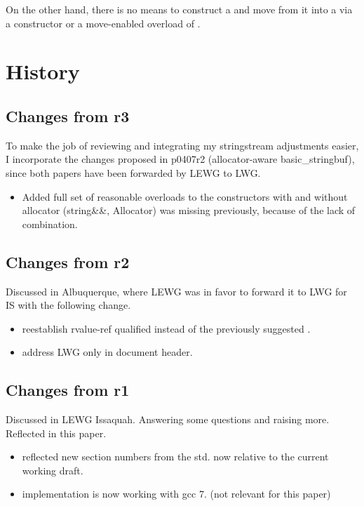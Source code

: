 \documentclass[ebook,11pt,article]{memoir}
\begin{document}
On the other hand, there is no means to construct a  and move from it into a  via a constructor or a move-enabled overload of .

\section{History}

\subsection{Changes from r3}
To make the job of reviewing and integrating my stringstream adjustments easier, I incorporate the changes proposed in p0407r2 (allocator-aware basic\_stringbuf), since both papers have been forwarded by LEWG to LWG.
\begin{itemize}
\item Added full set of reasonable overloads to the constructors with and without allocator (string\&\&, Allocator) was missing previously, because of the lack of combination.
\end{itemize}


\subsection{Changes from r2}
Discussed in Albuquerque, where LEWG was in favor to forward it to LWG for IS with the following change.
\begin{itemize}
\item reestablish rvalue-ref qualified  instead of the previously suggested .
\item address LWG only in document header.
\end{itemize}


\subsection{Changes from r1}
Discussed in LEWG Issaquah. Answering some questions and raising more. Reflected in this paper.
\begin{itemize}
\item reflected new section numbers from the std. now relative to the current working draft.
\item implementation is now working with gcc 7. (not relevant for this paper)
\end{itemize}
\end{document}
